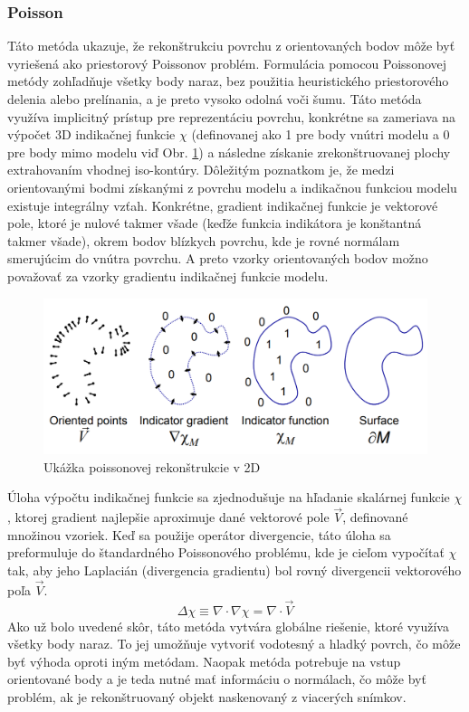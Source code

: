 \subsubsection{Poisson} \label{sec:poisson}
\noindent Táto metóda ukazuje, že rekonštrukciu povrchu z orientovaných bodov môže byť vyriešená ako priestorový Poissonov problém. Formulácia pomocou Poissonovej metódy zohľadňuje všetky body naraz, bez použitia heuristického priestorového delenia alebo prelínania, a je preto vysoko odolná voči šumu. \cite{poisson_origin}
\newline\indent Táto metóda využíva implicitný prístup pre reprezentáciu povrchu, konkrétne sa zameriava na výpočet 3D indikačnej funkcie $\chi$ (definovanej ako 1 pre body vnútri modelu a 0 pre body mimo modelu viď Obr. \ref{fig:poisson}) a následne získanie zrekonštruovanej plochy extrahovaním vhodnej iso-kontúry. Dôležitým poznatkom je, že medzi orientovanými bodmi získanými  z povrchu modelu a indikačnou funkciou  modelu existuje integrálny vzťah. Konkrétne, gradient indikačnej funkcie je vektorové pole, ktoré je nulové takmer všade (keďže funkcia indikátora je konštantná takmer všade), okrem bodov blízkych povrchu, kde je rovné normálam smerujúcim do vnútra povrchu. A preto vzorky orientovaných bodov možno považovať za vzorky gradientu indikačnej funkcie modelu. \cite{poisson_origin}
\begin{figure}[!htbp]
  \centering
  \includegraphics[width=14cm]{img/poisson.png}
  \caption{Ukážka poissonovej rekonštrukcie v 2D \cite{poisson_origin}} 
  \label{fig:poisson}
\end{figure} 
\newline\indent Úloha výpočtu indikačnej funkcie sa zjednodušuje na hľadanie skalárnej funkcie $\chi$, ktorej gradient najlepšie aproximuje dané vektorové pole $\vec{V}$, definované množinou vzoriek. Keď sa použije operátor divergencie, táto úloha sa preformuluje do štandardného Poissonového problému, kde je cieľom vypočítať $\chi$ tak, aby jeho Laplacián (divergencia gradientu) bol rovný divergencii vektorového poľa $\vec{V}$. \cite{poisson_origin}
\begin{equation}
    \Delta \chi \equiv \nabla \cdot \nabla \chi = \nabla \cdot \vec{V}
    \label{eq:poisson}
\end{equation}
\indent Ako už bolo uvedené skôr, táto metóda vytvára globálne riešenie, ktoré využíva všetky body naraz. To jej umožňuje vytvoriť vodotesný a hladký povrch, čo môže byť výhoda oproti iným metódam. Naopak metóda potrebuje na vstup orientované body a je teda nutné mať informáciu o normálach, čo môže byť problém, ak je rekonštruovaný objekt naskenovaný z viacerých snímkov.   

